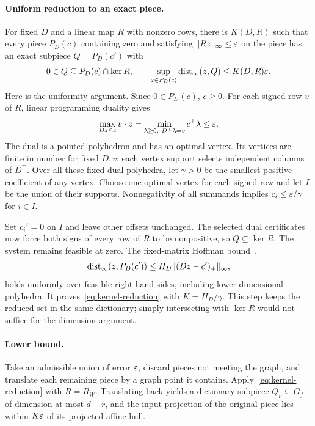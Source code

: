 \paragraph{Uniform reduction to an exact piece.}
For fixed $D$ and a linear map $R$ with nonzero rows, there is $K(D,R)$ such that every piece $P_D(c)$ containing zero and satisfying $\lVert Rz\rVert_\infty\le\varepsilon$ on the piece has an exact subpiece $Q=P_D(c')$ with
\begin{equation}\label{eq:kernel-reduction}
0\in Q\subseteq P_D(c)\cap\ker R,\qquad
\sup_{z\in P_D(c)}\operatorname{dist}_\infty(z,Q)\le K(D,R)\varepsilon.
\end{equation}
Here is the uniformity argument. Since $0\in P_D(c)$, $c\ge0$. For each signed row $v$ of $R$, linear programming duality gives
\[
\max_{Dz\le c}v\cdot z
=\min_{\lambda\ge0,\ D^\top\lambda=v}c^\top\lambda\le\varepsilon.
\]
The dual is a pointed polyhedron and has an optimal vertex. Its vertices are finite in number for fixed $D,v$: each vertex support selects independent columns of $D^\top$. Over all these fixed dual polyhedra, let $\gamma>0$ be the smallest positive coefficient of any vertex. Choose one optimal vertex for each signed row and let $I$ be the union of their supports. Nonnegativity of all summands implies $c_i\le\varepsilon/\gamma$ for $i\in I$.

Set $c_i'=0$ on $I$ and leave other offsets unchanged. The selected dual certificates now force both signs of every row of $R$ to be nonpositive, so $Q\subseteq\ker R$. The system remains feasible at zero. The fixed-matrix Hoffman bound~\cite[Prop.~1]{pena2018},
\[
\operatorname{dist}_\infty(z,P_D(c'))\le H_D\lVert(Dz-c')_+\rVert_\infty,
\]
holds uniformly over feasible right-hand sides, including lower-dimensional polyhedra. It proves~\eqref{eq:kernel-reduction} with $K=H_D/\gamma$. This step keeps the reduced set in the same dictionary; simply intersecting with $\ker R$ would not suffice for the dimension argument.

\paragraph{Lower bound.}
Take an admissible union of error $\varepsilon$, discard pieces not meeting the graph, and translate each remaining piece by a graph point it contains. Apply~\eqref{eq:kernel-reduction} with $R=R_W$. Translating back yields a dictionary subpiece $Q_\nu\subseteq G_f$ of dimension at most $d-r$, and the input projection of the original piece lies within $K\varepsilon$ of its projected affine hull.

